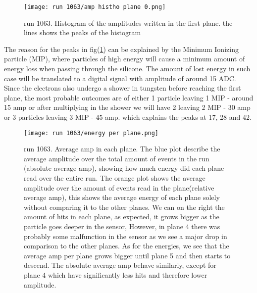 \documentclass[11pt]{article}
\begin{document}
\begin{figure}[h]
    \centering  \texttt{[image: run 1063/amp histho plane 0.png]}
    \caption{run 1063. Histogram of the amplitudes written in the first plane. the lines shows the peaks of the histogram}
    \label{amp histo plane 0}
\end{figure}



The reason for the peaks in fig(\ref{amp histo plane 0}) can be explained by the Minimum Ionizing particle (MIP), where particles of high energy will cause a minimum amount of energy loss when passing through the silicone. The amount of lost energy in such case will be translated to a digital signal with amplitude of around 15 ADC. Since the electrons also undergo a shower in tungsten before reaching the first plane, the most probable outcomes are of either 1 particle leaving 1 MIP - around 15 amp or after multiplying in the shower we will have 2 leaving 2 MIP - 30 amp or 3 particles leaving 3 MIP - 45 amp. which explains the peaks at 17, 28 and 42.






\begin{figure}[h]
    \centering  \texttt{[image: run 1063/energy per plane.png]}
    \caption{run 1063. Average amp in each plane. The blue plot describe the average amplitude over the total amount of events in the run (absolute average amp), showing how much energy did each plane read over the entire run. The orange plot shows the average amplitude over the amount of events read in the plane(relative average amp), this shows the average energy of each plane solely without comparing it to the other planes. We can on the right the amount of hits in each plane, as expected, it grows bigger as the particle goes deeper in the sensor, However, in plane 4 there was probably some malfunction in the sensor as we see a major drop in comparison to the other planes. As for the energies, we see that the average amp per plane grows bigger until plane 5 and then starts to descend. The absolute average amp behave similarly, except for plane 4 which have significantly less hits and therefore lower amplitude.}
    \label{avg amp per plane run 1101}
\end{figure}
\end{document}
